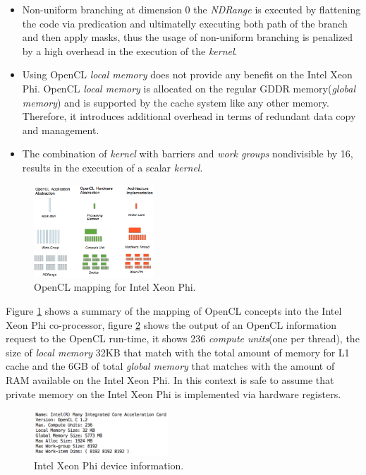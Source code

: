 \begin{itemize}
    \item Non-uniform branching at dimension 0 the \emph{NDRange} is executed by flattening the code via predication and 
        ultimatelly executing both path of the branch and then apply masks, thus the usage of non-uniform branching is penalized by 
        a high overhead in the execution of the \emph{kernel}\cite{opencl_phi}.
    \item Using OpenCL \emph{local memory} does not provide any benefit on the Intel Xeon Phi. OpenCL \emph{local memory} is 
        allocated on the regular GDDR memory(\emph{global memory}) and is supported by the cache system like any other memory. 
        Therefore, it introduces additional overhead in terms of redundant data copy and management\cite{opencl_phi}.
    \item The combination of \emph{kernel} with barriers and \emph{work groups} nondivisible by 16, results in the execution of a
        scalar \emph{kernel}.
\end{itemize}

\begin{figure}[!h]
    \centering
    \includegraphics[width=0.4\textwidth]{figures/phi_model.png}
    \caption{OpenCL mapping for Intel Xeon Phi.}
    \label{PhiModel}
\end{figure}

\par{Figure \ref{PhiModel} shows a summary of the mapping of OpenCL concepts into the Intel Xeon Phi co-processor, figure 
    \ref{PhiDeviceInfo} shows the output of an OpenCL information request to the OpenCL run-time, it shows 236 
    \emph{compute units}(one per thread), the size of \emph{local memory} 32KB that match with the total amount of memory for L1 cache and
    the 6GB of total \emph{global memory} that matches with the amount of RAM available on the Intel Xeon Phi. In this context is 
    safe to assume that private memory on the Intel Xeon Phi is implemented via hardware registers.} 

\begin{figure}[!h]
    \centering
    \includegraphics[width=0.45\textwidth]{figures/phi_device_info.png}
    \caption{Intel Xeon Phi device information.}
    \label{PhiDeviceInfo}
\end{figure}



